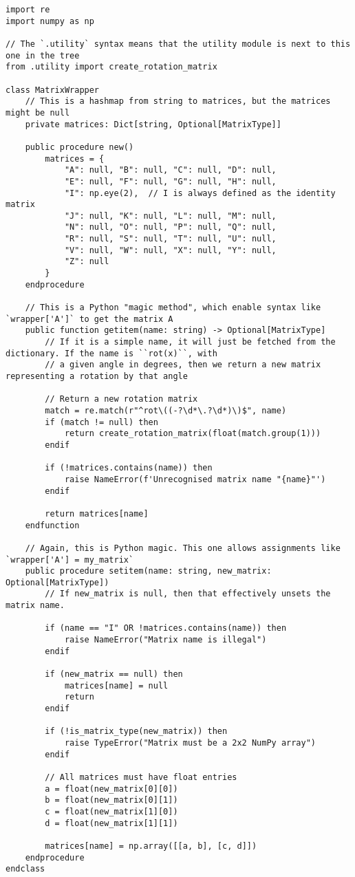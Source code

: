\documentclass[../main.tex]{subfiles}
\begin{document}
\begin{verbatim}
import re
import numpy as np

// The `.utility` syntax means that the utility module is next to this one in the tree
from .utility import create_rotation_matrix

class MatrixWrapper
	// This is a hashmap from string to matrices, but the matrices might be null
	private matrices: Dict[string, Optional[MatrixType]]

	public procedure new()
		matrices = {
			"A": null, "B": null, "C": null, "D": null,
			"E": null, "F": null, "G": null, "H": null,
			"I": np.eye(2),  // I is always defined as the identity matrix
			"J": null, "K": null, "L": null, "M": null,
			"N": null, "O": null, "P": null, "Q": null,
			"R": null, "S": null, "T": null, "U": null,
			"V": null, "W": null, "X": null, "Y": null,
			"Z": null
		}
	endprocedure

	// This is a Python "magic method", which enable syntax like `wrapper['A']` to get the matrix A
	public function getitem(name: string) -> Optional[MatrixType]
		// If it is a simple name, it will just be fetched from the dictionary. If the name is ``rot(x)``, with
		// a given angle in degrees, then we return a new matrix representing a rotation by that angle

		// Return a new rotation matrix
		match = re.match(r"^rot\((-?\d*\.?\d*)\)$", name)
		if (match != null) then
			return create_rotation_matrix(float(match.group(1)))
		endif

		if (!matrices.contains(name)) then
			raise NameError(f'Unrecognised matrix name "{name}"')
		endif

		return matrices[name]
	endfunction

	// Again, this is Python magic. This one allows assignments like `wrapper['A'] = my_matrix`
	public procedure setitem(name: string, new_matrix: Optional[MatrixType])
		// If new_matrix is null, then that effectively unsets the matrix name.

		if (name == "I" OR !matrices.contains(name)) then
			raise NameError("Matrix name is illegal")
		endif

		if (new_matrix == null) then
			matrices[name] = null
			return
		endif

		if (!is_matrix_type(new_matrix)) then
			raise TypeError("Matrix must be a 2x2 NumPy array")
		endif

		// All matrices must have float entries
		a = float(new_matrix[0][0])
		b = float(new_matrix[0][1])
		c = float(new_matrix[1][0])
		d = float(new_matrix[1][1])

		matrices[name] = np.array([[a, b], [c, d]])
	endprocedure
endclass
\end{verbatim}
\end{document}
